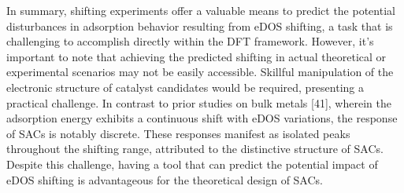 In summary, shifting experiments offer a valuable means to predict the potential disturbances in adsorption behavior resulting from eDOS shifting, a task that is challenging to accomplish directly within the DFT framework.
However, it's important to note that achieving the predicted shifting in actual theoretical or experimental scenarios may not be easily accessible.
Skillful manipulation of the electronic structure of catalyst candidates would be required, presenting a practical challenge. In contrast to prior studies on bulk metals [41], wherein the adsorption energy exhibits a continuous shift with eDOS variations, the response of SACs is notably discrete.
These responses manifest as isolated peaks throughout the shifting range, attributed to the distinctive structure of SACs.
Despite this challenge, having a tool that can predict the potential impact of eDOS shifting is advantageous for the theoretical design of SACs.
